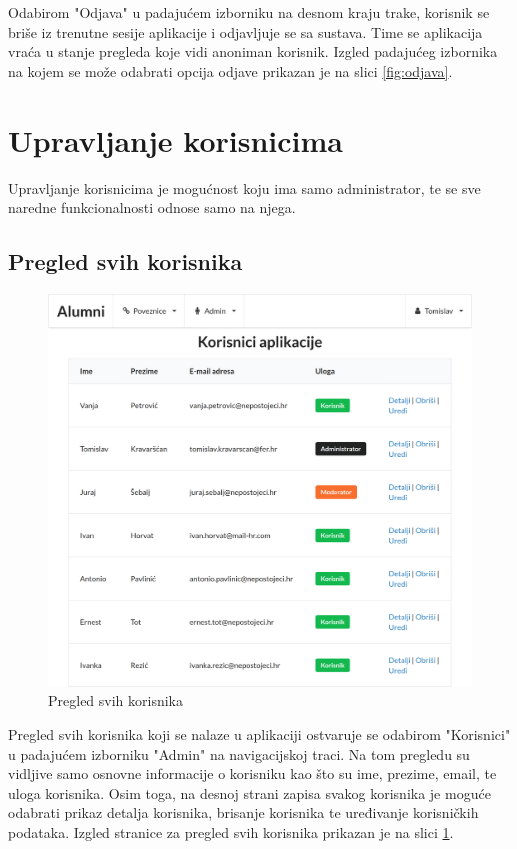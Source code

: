 \documentclass[zavrsni, numeric]{fer}
\begin{document}
Odabirom "Odjava" u padajućem izborniku na desnom kraju trake, korisnik se briše iz trenutne sesije aplikacije i odjavljuje se sa sustava. Time se aplikacija vraća u stanje pregleda koje vidi anoniman korisnik. Izgled padajućeg izbornika na kojem se može odabrati opcija odjave prikazan je na slici \ref{fig:odjava}.

\section{Upravljanje korisnicima}
Upravljanje korisnicima je mogućnost koju ima samo administrator, te se sve naredne funkcionalnosti odnose samo na njega.

\subsection{Pregled svih korisnika}

\begin{figure}[H]
	\centering
	\includegraphics[width=13cm]{slike/korisnici.png}
	\caption{Pregled svih korisnika}
	\label{fig:korisnici}
\end{figure}

Pregled svih korisnika koji se nalaze u aplikaciji ostvaruje se odabirom "Korisnici" u padajućem izborniku "Admin" na navigacijskoj traci. Na tom pregledu su vidljive samo osnovne informacije o korisniku kao što su ime, prezime, email, te uloga korisnika. Osim toga, na desnoj strani zapisa svakog korisnika je moguće odabrati prikaz detalja korisnika, brisanje korisnika te uređivanje korisničkih podataka. Izgled stranice za pregled svih korisnika prikazan je na slici \ref{fig:korisnici}.
\end{document}
